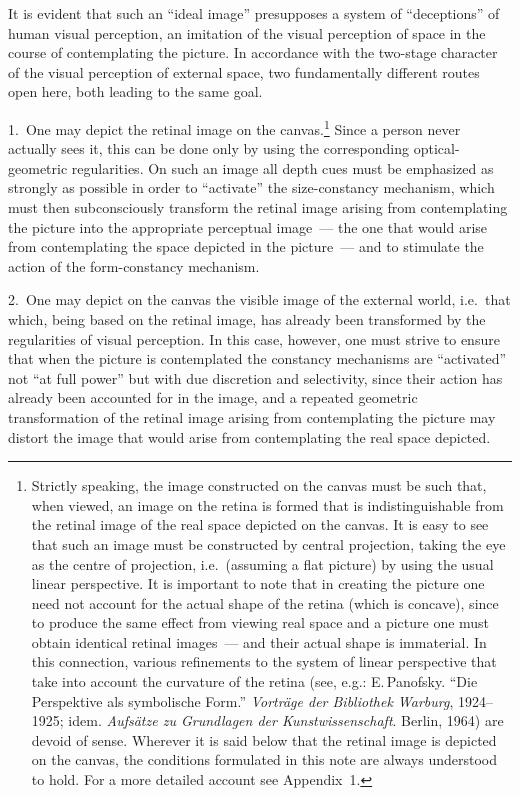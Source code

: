 It is evident that such an ``ideal image'' presupposes a system of ``deceptions'' of
human visual perception, an imitation of the visual perception of space in the course of
contemplating the picture.  In accordance with the two-stage character of the visual
perception of external space, two fundamentally different routes open here, both leading
to the same goal.

1.~One may depict the retinal image on the canvas.\footnote{%
  Strictly speaking, the image constructed on the canvas must be such that, when
  viewed, an image on the retina is formed that is indistinguishable from the retinal
  image of the real space depicted on the canvas.  It is easy to see that such an image
  must be constructed by central projection, taking the eye as the centre of projection,
  i.e.\ (assuming a flat picture) by using the usual linear perspective.  It is important
  to note that in creating the picture one need not account for the actual shape of the
  retina (which is concave), since to produce the same effect from viewing real space
  and a picture one must obtain identical retinal images~--- and their actual shape is
  immaterial.  In this connection, various refinements to the system of linear perspective
  that take into account the curvature of the retina (see, e.g.: E.\,Panofsky.
  ``Die Perspektive als symbolische Form.'' \emph{Vortr\"age der Bibliothek Warburg},
  1924--1925; idem. \emph{Aufs\"atze zu Grundlagen der Kunstwissenschaft}.
  Berlin, 1964) are devoid of sense.  Wherever it is said below that the retinal image
  is depicted on the canvas, the conditions formulated in this note are always understood
  to hold.  For a more detailed account see Appendix~1.}
  Since a person never actually sees it, this can be done only by using the
corresponding optical-geometric regularities.  On such an image all depth cues must be
emphasized as strongly as possible in order to ``activate'' the size-constancy mechanism,
which must then subconsciously transform the retinal image arising from contemplating
the picture into the appropriate perceptual image~--- the one that would arise from
contemplating the space depicted in the picture~--- and to stimulate the action of the
form-constancy mechanism.

2.~One may depict on the canvas the visible image of the external world, i.e.\ that
which, being based on the retinal image, has already been transformed by the
regularities of visual perception.  In this case, however, one must strive to ensure that
when the picture is contemplated the constancy mechanisms are ``activated'' not ``at full
power'' but with due discretion and selectivity, since their action has already been
accounted for in the image, and a repeated geometric transformation of the retinal image
arising from contemplating the picture may distort the image that would arise from
contemplating the real space depicted.

